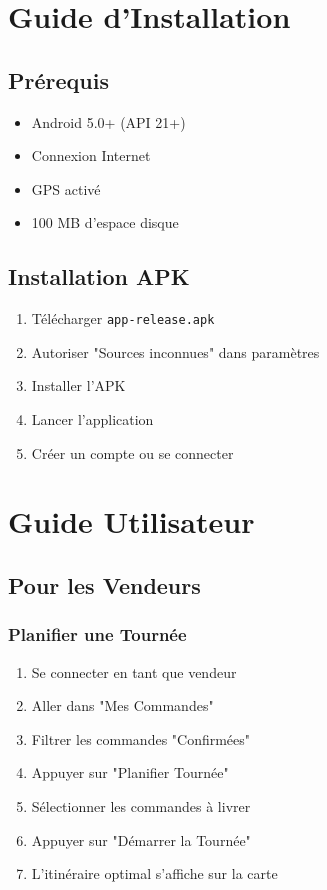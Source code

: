 \documentclass[12pt,a4paper]{report}
\begin{document}
\chapter{Guide d'Installation}

\section{Prérequis}

\begin{itemize}
    \item Android 5.0+ (API 21+)
    \item Connexion Internet
    \item GPS activé
    \item 100 MB d'espace disque
\end{itemize}

\section{Installation APK}

\begin{enumerate}
    \item Télécharger \texttt{app-release.apk}
    \item Autoriser "Sources inconnues" dans paramètres
    \item Installer l'APK
    \item Lancer l'application
    \item Créer un compte ou se connecter
\end{enumerate}

\chapter{Guide Utilisateur}

\section{Pour les Vendeurs}

\subsection{Planifier une Tournée}

\begin{enumerate}
    \item Se connecter en tant que vendeur
    \item Aller dans "Mes Commandes"
    \item Filtrer les commandes "Confirmées"
    \item Appuyer sur "Planifier Tournée"
    \item Sélectionner les commandes à livrer
    \item Appuyer sur "Démarrer la Tournée"
    \item L'itinéraire optimal s'affiche sur la carte
\end{enumerate}
\end{document}
